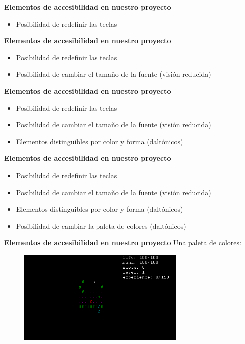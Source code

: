 
\begin{tframe}{\textbf{Elementos de accesibilidad en nuestro proyecto}}
	\begin{itemize}
		\item<+-| alert@+> Posibilidad de redefinir las teclas
	\end{itemize}
\end{tframe}

\begin{tframe}{\textbf{Elementos de accesibilidad en nuestro proyecto}}
	\begin{itemize}
		\item Posibilidad de redefinir las teclas
		\item<+-| alert@+> Posibilidad de cambiar el tamaño de la fuente (visión reducida)
	\end{itemize}
\end{tframe}

\begin{tframe}{\textbf{Elementos de accesibilidad en nuestro proyecto}}
	\begin{itemize}
		\item Posibilidad de redefinir las teclas
		\item Posibilidad de cambiar el tamaño de la fuente (visión reducida)
		\item<+-| alert@+> Elementos distinguibles por color y forma (daltónicos)
	\end{itemize}
\end{tframe}

\begin{tframe}{\textbf{Elementos de accesibilidad en nuestro proyecto}}
	\begin{itemize}
		\item Posibilidad de redefinir las teclas
		\item Posibilidad de cambiar el tamaño de la fuente (visión reducida)
		\item Elementos distinguibles por color y forma (daltónicos)
		\item<+-| alert@+> Posibilidad de cambiar la paleta de colores (daltónicos)
	\end{itemize}
\end{tframe}

\begin{tframe}{\textbf{Elementos de accesibilidad en nuestro proyecto}}
	Una paleta de colores:
		\begin{figure}[h]
			\includegraphics[width=8cm]{../img/paletaColores1.PNG}
		\end{figure}
\end{tframe}

